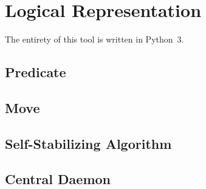 
\section{Logical Representation}
\label{sec:logic-repr}

The entirety of this tool is written in Python~3.

\subsection{Predicate}
\label{sec:logic-repr:predicate}


\subsection{Move}
\label{sec:logic-repr:move}

\subsection{Self-Stabilizing Algorithm}
\label{sec:logic-repr:self-stab-algor}


\subsection{Central Daemon}
\label{sec:logic-repr:daemon}

